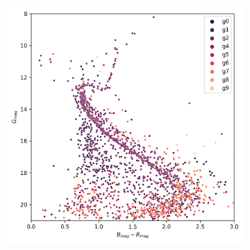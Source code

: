 \documentclass[preprint,12pt,authoryear]{elsarticle}
\begin{document}
\begin{figure}[!hbt]
\begin{subfigure}{0.29\textwidth}
  \end{subfigure}
  \begin{subfigure}{0.29\textwidth}
    \includegraphics[width=\textwidth]{../figures/ngc_2682/dec_hr_diagram_filtered_ngc_2682.png}
  \end{subfigure}


\end{figure}
\end{document}
